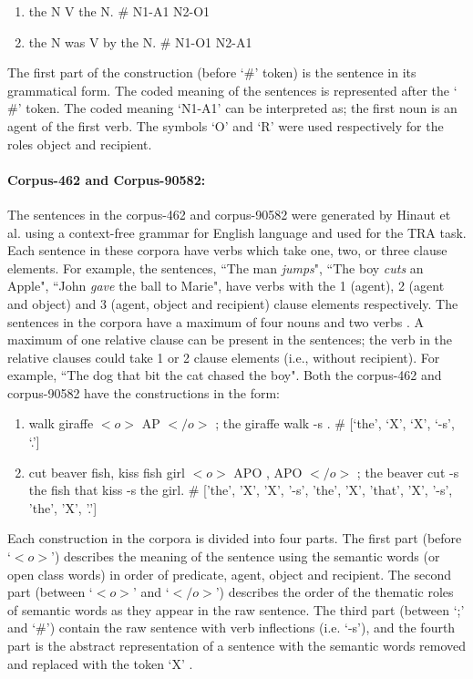 \begin{enumerate}[noitemsep]
\item the N V the N. \# N1-A1 N2-O1
\item the N was V by the N. \# N1-O1 N2-A1
\end{enumerate}

The first part of the construction (before `$\#$' token) is the sentence in its grammatical form. The coded meaning of the sentences is represented after the `$\#$' token. The coded meaning `N1-A1' can be interpreted as; the first noun is an agent of the first verb. The symbols `O' and `R' were used respectively for the roles object and recipient.

\paragraph{Corpus-462 and Corpus-90582:} The sentences in the corpus-462 and corpus-90582 were generated by Hinaut et al. \cite{xavier:2013:RT} using a context-free grammar for English language and used for the TRA task. Each sentence in these corpora have verbs which take one, two, or three clause elements. For example, the sentences, ``The man \textit{jumps}", ``The boy \textit{cuts} an Apple", ``John \textit{gave} the ball to Marie", have verbs with the 1 (agent), 2 (agent and object) and 3 (agent, object and recipient) clause elements respectively. The sentences in the corpora have a maximum of four nouns and two verbs \cite{xavier:2013:RT}. A maximum of one relative clause can be present in the sentences; the verb in the relative clauses could take 1 or 2 clause elements (i.e., without recipient). For example, ``The dog that bit the cat chased the boy". Both the corpus-462 and corpus-90582 have the constructions in the form:

\begin{enumerate}[noitemsep]
\item walk giraffe $<\!o\!>$ AP $<\!/o\!>$ ; the giraffe walk -s . \# [`the', `X', `X', `-s', `.']
\item cut beaver fish, kiss fish girl $<\!o\!>$ APO , APO $<\!/o\!>$ ; the beaver cut -s the fish that kiss -s the girl. \# ['the', 'X', 'X', '-s', 'the', 'X', 'that', 'X', '-s', 'the', 'X', '.']
\end{enumerate}

Each construction in the corpora is divided into four parts. The first part (before `$<\!o\!>$') describes the meaning of the sentence using the semantic words (or open class words) in order of predicate, agent, object and recipient. The second part (between `$<\!o\!>$' and `$<\!/o\!>$') describes the order of the thematic roles of semantic words as they appear in the raw sentence. The third part (between `;' and `\#') contain the raw sentence with verb inflections (i.e. `-s'), and the fourth part is the abstract representation of a sentence with the semantic words removed and replaced with the token `X' \cite{xavier:2013:RT}. 

